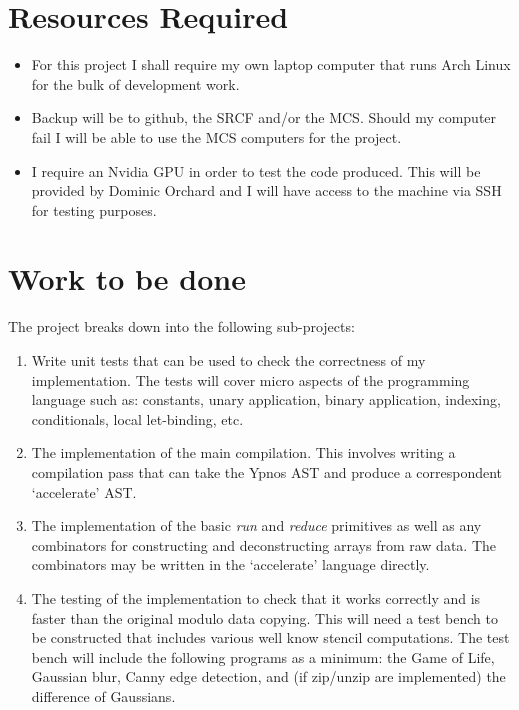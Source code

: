 \section*{Resources Required}

\begin{itemize} 

\item For this project I shall require my own laptop computer that runs Arch 
Linux for the bulk of development work. 

\item Backup will be to github, the SRCF and/or the MCS. Should my computer 
fail I will be able to use the MCS computers for the project.

\item I require an Nvidia GPU in order to test the code produced. This will be 
provided by Dominic Orchard and I will have access to the machine via SSH for 
testing purposes.

\end{itemize}

\section*{Work to be done}

The project breaks down into the following sub-projects:

\begin{enumerate}

\item Write unit tests that can be used to check the correctness of my 
implementation. The tests will cover micro aspects of the programming language 
such as: constants, unary application, binary application, indexing, 
conditionals, local let-binding, etc.

\item The implementation of the main compilation. This involves writing a 
compilation pass that can take the Ypnos AST and produce a correspondent 
`accelerate' AST.

\item The implementation of the basic \emph{run} and \emph{reduce} primitives 
as well as any combinators for constructing and deconstructing arrays from raw 
data. The combinators may be written in the `accelerate' language directly.

\item The testing of the implementation to check that it works correctly and is 
faster than the original modulo data copying. This will need a test bench to be 
constructed that includes various well know stencil computations. The test 
bench will include the following programs as a minimum: the Game of Life, 
Gaussian blur, Canny edge detection, and (if zip/unzip are implemented) the 
difference of Gaussians.

\end{enumerate}

